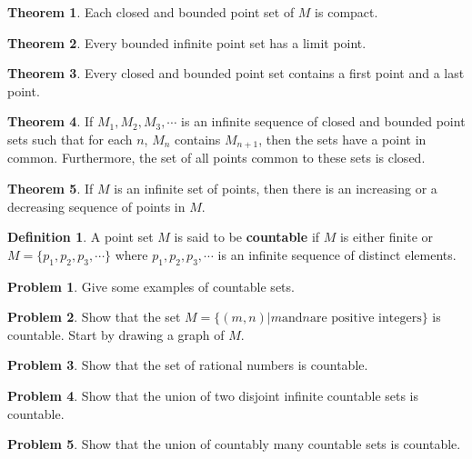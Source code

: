 \documentclass{article}
\theoremstyle{definition}
\newtheorem{definition}{Definition}
\newtheorem{theorem}{Theorem}
\theoremstyle{definition}
\newtheorem{problem}{Problem}
\theoremstyle{plain}
\begin{document}
\begin{theorem}
  Each closed and bounded point set of $M$ is compact.
\end{theorem}

\begin{theorem}
  Every bounded infinite point set has a limit point.
\end{theorem}

\begin{theorem}
  Every closed and bounded point set contains a first point and a last point.
\end{theorem}

\begin{theorem}
  If $M_1, M_2, M_3, \cdots$ is an infinite sequence of closed and bounded
  point sets such that for each $n$, $M_n$ contains $M_{n+1}$, then the sets
  have a point in common.  Furthermore, the set of all points common to these
  sets is closed.
\end{theorem}

\begin{theorem}
  If $M$ is an infinite set of points, then there is an increasing or a
  decreasing sequence of points in $M$.
\end{theorem}

\begin{definition}
  A point set $M$ is said to be \textbf{countable} if $M$ is either finite or
  $M = \{p_1, p_2, p_3, \cdots\}$ where $p_1, p_2, p_3, \cdots$ is an infinite
  sequence of distinct elements.
\end{definition}

\begin{problem}
  Give some examples of countable sets.
\end{problem}

\begin{problem}
  Show that the set $M = \{(m,n) | m \textrm{and} n \textrm{are positive
  integers}\}$ is countable.  Start by drawing a graph of $M$.
\end{problem}

\begin{problem}
  Show that the set of rational numbers is countable.
\end{problem}

\begin{problem}
  Show that the union of two disjoint infinite countable sets is countable.
\end{problem}

\begin{problem}
  Show that the union of countably many countable sets is countable.
\end{problem}
\end{document}
